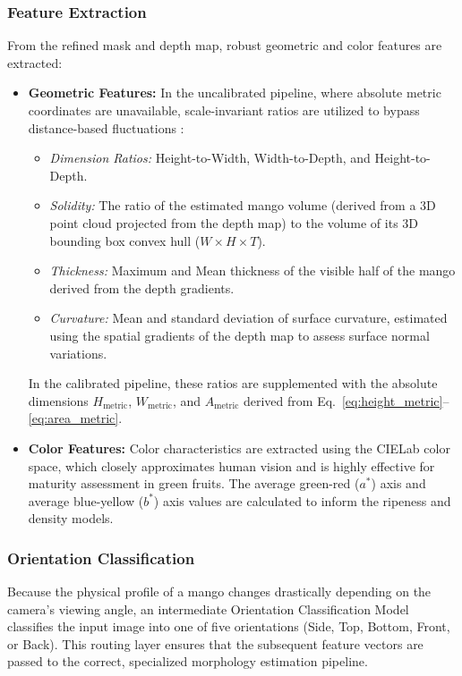 \subsubsection{Feature Extraction}
From the refined mask and depth map, robust geometric and color features are extracted:
\begin{itemize}
    \item \textbf{Geometric Features:} In the uncalibrated pipeline, where absolute metric coordinates are unavailable, scale-invariant ratios are utilized to bypass distance-based fluctuations \cite{depthanythingv2}:
    \begin{itemize}
        \item \textit{Dimension Ratios:} Height-to-Width, Width-to-Depth, and Height-to-Depth.
        \item \textit{Solidity:} The ratio of the estimated mango volume (derived from a 3D
point cloud projected from the depth map) to the volume of its 3D bounding box convex
hull ($W \times H \times T$).
        \item \textit{Thickness:} Maximum and Mean thickness of the visible half of the mango
        derived from the depth gradients.
        \item \textit{Curvature:} Mean and standard deviation of surface curvature, estimated
        using the spatial gradients of the depth map to assess surface normal variations.
    \end{itemize}
    In the calibrated pipeline, these ratios are supplemented with the absolute dimensions
    $H_{\text{metric}}$, $W_{\text{metric}}$, and $A_{\text{metric}}$ derived from
    Eq.~\ref{eq:height_metric}--\ref{eq:area_metric}.
    \item \textbf{Color Features:} Color characteristics are extracted using the CIELab color
    space, which closely approximates human vision and is highly effective for maturity
    assessment in green fruits. The average green-red ($a^*$) axis and average blue-yellow
    ($b^*$) axis values are calculated to inform the ripeness and density models.
\end{itemize}

\subsubsection{Orientation Classification}
Because the physical profile of a mango changes drastically depending on the camera's viewing
angle, an intermediate Orientation Classification Model classifies the input image into one of
five orientations (Side, Top, Bottom, Front, or Back). This routing layer ensures that the
subsequent feature vectors are passed to the correct, specialized morphology estimation pipeline.

